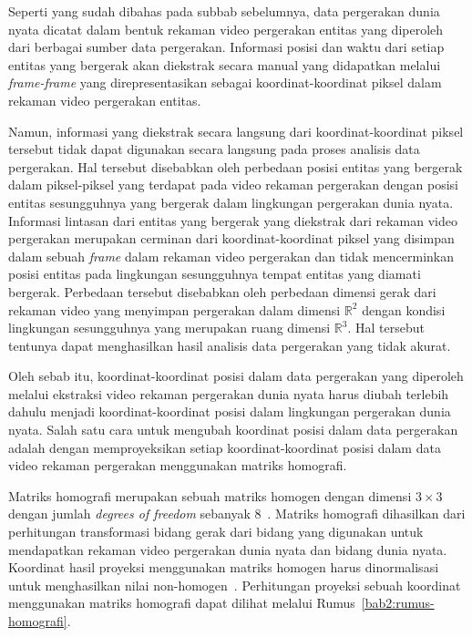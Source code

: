 Seperti yang sudah dibahas pada subbab sebelumnya, data pergerakan dunia nyata dicatat dalam bentuk rekaman video pergerakan entitas yang diperoleh dari berbagai sumber data pergerakan. Informasi posisi dan waktu dari setiap entitas yang bergerak akan diekstrak secara manual yang didapatkan melalui \textit{frame-frame} yang direpresentasikan sebagai koordinat-koordinat piksel dalam rekaman video pergerakan entitas.

Namun, informasi yang diekstrak secara langsung dari koordinat-koordinat piksel tersebut tidak dapat digunakan secara langsung pada proses analisis data pergerakan. Hal tersebut disebabkan oleh perbedaan posisi entitas yang bergerak dalam piksel-piksel yang terdapat pada video rekaman pergerakan dengan posisi entitas sesungguhnya yang bergerak dalam lingkungan pergerakan dunia nyata. Informasi lintasan dari entitas yang bergerak yang diekstrak dari rekaman video pergerakan merupakan cerminan dari koordinat-koordinat piksel yang disimpan dalam sebuah \textit{frame} dalam rekaman video pergerakan dan tidak mencerminkan posisi entitas pada lingkungan sesungguhnya tempat entitas yang diamati bergerak. Perbedaan tersebut disebabkan oleh perbedaan dimensi gerak dari rekaman video yang menyimpan pergerakan dalam dimensi $\mathbb{R}^2$ dengan kondisi lingkungan sesungguhnya yang merupakan ruang dimensi $\mathbb{R}^3$. Hal tersebut tentunya dapat menghasilkan hasil analisis data pergerakan yang tidak akurat.

Oleh sebab itu, koordinat-koordinat posisi dalam data pergerakan yang diperoleh melalui ekstraksi video rekaman pergerakan dunia nyata harus diubah terlebih dahulu menjadi koordinat-koordinat posisi dalam lingkungan pergerakan dunia nyata. Salah satu cara untuk mengubah koordinat posisi dalam data pergerakan adalah dengan memproyeksikan setiap koordinat-koordinat posisi dalam data video rekaman pergerakan menggunakan matriks homografi.

Matriks homografi merupakan sebuah matriks homogen dengan dimensi $3 \times 3$ dengan jumlah \textit{degrees of freedom} sebanyak $8$~\cite{dubrofsky:02:degree-of-freedom}. Matriks homografi dihasilkan dari perhitungan transformasi bidang gerak dari bidang yang digunakan untuk mendapatkan rekaman video pergerakan dunia nyata dan bidang dunia nyata. Koordinat hasil proyeksi menggunakan matriks homogen harus dinormalisasi untuk menghasilkan nilai non-homogen~\cite{szeliski:02:homography}. Perhitungan proyeksi sebuah koordinat menggunakan matriks homografi dapat dilihat melalui Rumus~\ref{bab2:rumus-homografi}.

